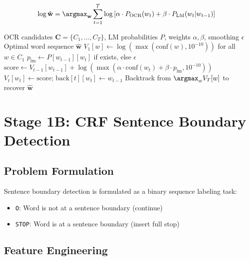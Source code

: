 \documentclass[12pt, a4paper, twoside]{report}
\begin{document}
\begin{equation}
\log \hat{\mathbf{w}} = \argmax_{\mathbf{w}} \sum_{t=1}^{T} \log\left[\alpha \cdot P_{\text{OCR}}(w_t) + \beta \cdot P_{\text{LM}}(w_t | w_{t-1})\right]
\label{eq:viterbi-log}
\end{equation}

\begin{algorithm}[htbp]
\caption{Viterbi Decoding in Log-Space}
\label{alg:viterbi}
\begin{algorithmic}[1]
\REQUIRE OCR candidates $\mathbf{C} = \{C_1, \ldots, C_T\}$, LM probabilities $P$, weights $\alpha, \beta$, smoothing $\epsilon$
\ENSURE Optimal word sequence $\hat{\mathbf{w}}$
\STATE $V_1[w] \leftarrow \log(\max(\text{conf}(w), 10^{-10}))$ for all $w \in C_1$
            \STATE $p_{\text{lm}} \leftarrow P[w_{t-1}][w_t]$ if exists, else $\epsilon$
            \STATE $\text{score} \leftarrow V_{t-1}[w_{t-1}] + \log(\max(\alpha \cdot \text{conf}(w_t) + \beta \cdot p_{\text{lm}}, 10^{-10}))$
                \STATE $V_t[w_t] \leftarrow \text{score}$; $\text{back}[t][w_t] \leftarrow w_{t-1}$
            \ENDIF
        \ENDFOR
    \ENDFOR
\ENDFOR
\STATE Backtrack from $\argmax_{w} V_T[w]$ to recover $\hat{\mathbf{w}}$
\end{algorithmic}
\end{algorithm}

\section{Stage 1B: CRF Sentence Boundary Detection}
\label{sec:crf-method}

\subsection{Problem Formulation}

Sentence boundary detection is formulated as a binary sequence labeling task:
\begin{itemize}
    \item \texttt{O}: Word is not at a sentence boundary (continue)
    \item \texttt{STOP}: Word is at a sentence boundary (insert full stop)
\end{itemize}

\subsection{Feature Engineering}
\label{sec:features}
\end{document}

